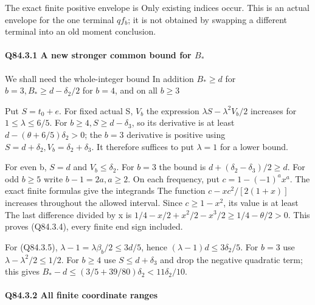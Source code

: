 The exact finite positive envelope is
Only existing indices occur. This is an actual envelope for the one
terminal \(qf_b\); it is not obtained by swapping a different terminal
into an old moment conclusion.

\paragraph{Q84.3.1 A new stronger common bound for \(B_*\)}

We shall need the whole-integer bound
In addition \(B_*\ge d\) for \(b=3,\allowbreak  B_*\ge d-\delta_2/2\) for \(b=4\),
and on all \(b\ge 3\)

Put \(S=t_0+e\). For fixed actual S, \(V_b\) the expression
\(\lambda S-\lambda^2V_b/2\) increases for \(1\le\lambda\le6/5\).
For \(b\ge 4,\allowbreak  S\ge d-\delta_3\), so its derivative is at least
\(d-(\theta+6/5)\delta_2>0\); the \(b=3\) derivative is positive using
\(S=d+\delta_2,\allowbreak  V_b=\delta_2+\delta_3\).
It therefore suffices to put \(\lambda=1\) for a lower bound.

For even b, \(S=d\) and \(V_b\le \delta_2\). For \(b=3\) the bound is
\(d+(\delta_2-\delta_3)/2\ge d\). For odd \(b\ge 5\) write \(b-1=2a,\allowbreak  a\ge 2\).
On each frequency, put \(c=1-(-1)^a x^a\). The exact finite formulas
give the integrands
The function \(c-xc^2/[2(1+x)]\) increases throughout the allowed
interval. Since \(c\ge 1-x^2\), its value is at least
The last difference divided by x is
\(1/4-x/2+x^2/2-x^3/2\ge1/4-\theta/2>0\).
This proves (Q84.3.4), every finite end sign included.

For (Q84.3.5), \(\lambda-1=\lambda\beta_b/2\le3d/5\), hence
\((\lambda-1)d\le3\delta_2/5\). For \(b=3\) use
\(\lambda-\lambda^2/2\le1/2\). For \(b\ge 4\) use \(S\le d+\delta_3\)
and drop the negative quadratic term; this gives
\(B_*-d\le(3/5+39/80)\delta_2<11\delta_2/10\).

\paragraph{Q84.3.2 All finite coordinate ranges}

